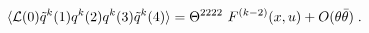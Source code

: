 \begin{equation}\label{4}
  \langle {\cal L}(0) \tilde q^k(1) q^k(2) q^k(3) \tilde q^k(4) \rangle = \Theta^{2222} \ F^{(k-2)} (x,u) + O(\theta\bar\theta)\;.
\end{equation}

